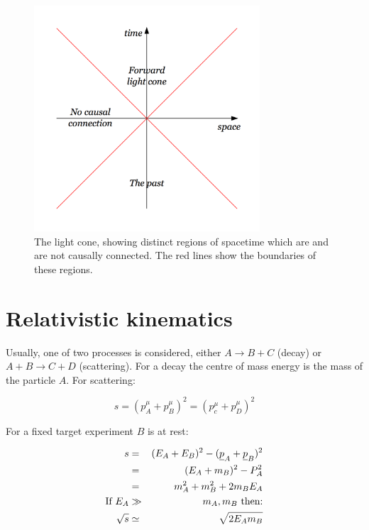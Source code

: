 \begin{figure}[!htb]
  \begin{center}
    \includegraphics[width=0.75\textwidth]{images/chapter_5/lightcone.pdf}
    \caption[The light cone]{The light cone, showing distinct regions of spacetime which are and are not causally connected.  The red lines show the boundaries of these regions.}
    \label{fig:ch5_lightcone}
  \end{center}
\end{figure}

\section{Relativistic kinematics}

Usually, one of two processes is considered, either $A \to B + C$ (decay) or $A + B \to C + D$ (scattering).  For a decay the centre of mass energy is the mass of the particle $A$.  For scattering:

\[
  s = (p^{\mu}_A + p^{\mu}_B)^2 = (p^{\mu}_c + p^{\mu}_D)^2
\]

For a fixed target experiment $B$ is at rest:

\begin{eqnarray*}
  s & = & (E_A + E_B)^2 - (\underline{p}_A + \underline{p}_B)^2 \\
    & = & (E_A + m_B)^2 - P^2_A \\
    & = & m^2_A + m^2_B + 2m_BE_A \\
    \textrm{If } E_A & \gg & m_A, m_B \textrm{ then:} \\
    \sqrt{s} & \simeq & \sqrt{2E_A m_B}
\end{eqnarray*}

